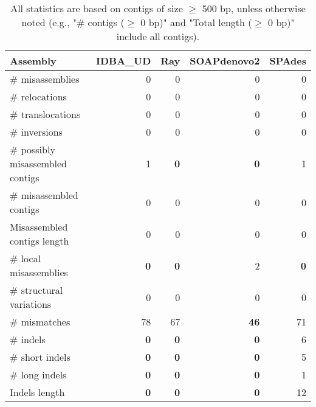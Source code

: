 \documentclass[12pt,a4paper]{article}
\begin{document}
\begin{table}[ht]
\begin{center}
\caption{All statistics are based on contigs of size $\geq$ 500 bp, unless otherwise noted (e.g., "\# contigs ($\geq$ 0 bp)" and "Total length ($\geq$ 0 bp)" include all contigs).}
\begin{tabular}{|l*{4}{|r}|}
\hline
Assembly & IDBA\_UD & Ray & SOAPdenovo2 & SPAdes \\ \hline
\# misassemblies & 0 & 0 & 0 & 0 \\ \hline
\hspace{5mm}\# relocations & 0 & 0 & 0 & 0 \\ \hline
\hspace{5mm}\# translocations & 0 & 0 & 0 & 0 \\ \hline
\hspace{5mm}\# inversions & 0 & 0 & 0 & 0 \\ \hline
\# possibly misassembled contigs & 1 & {\bf 0} & {\bf 0} & 1 \\ \hline
\# misassembled contigs & 0 & 0 & 0 & 0 \\ \hline
Misassembled contigs length & 0 & 0 & 0 & 0 \\ \hline
\# local misassemblies & {\bf 0} & {\bf 0} & 2 & {\bf 0} \\ \hline
\# structural variations & 0 & 0 & 0 & 0 \\ \hline
\# mismatches & 78 & 67 & {\bf 46} & 71 \\ \hline
\# indels & {\bf 0} & {\bf 0} & {\bf 0} & 6 \\ \hline
\hspace{5mm}\# short indels & {\bf 0} & {\bf 0} & {\bf 0} & 5 \\ \hline
\hspace{5mm}\# long indels & {\bf 0} & {\bf 0} & {\bf 0} & 1 \\ \hline
Indels length & {\bf 0} & {\bf 0} & {\bf 0} & 12 \\ \hline
\end{tabular}
\end{center}
\end{table}
\end{document}
